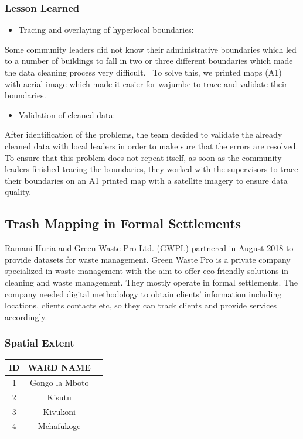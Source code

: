 \documentclass[a4paper,12pt,twoside]{article}
\begin{document}
\subsubsection{Lesson Learned}
\begin{itemize}
    \item Tracing and overlaying of hyperlocal boundaries:
\end{itemize}
Some community leaders did not know their administrative boundaries which led to a number of buildings to fall in two or three different boundaries which made the data cleaning process very difficult.
\
To solve this, we printed maps (A1) with aerial image which made it easier for wajumbe to trace and validate their boundaries. 
\begin{itemize}
    \item Validation of cleaned data:
\end{itemize}
After identification of the problems, the team decided to validate the already cleaned data with local leaders in order to make sure that the errors are resolved. To ensure that this problem does not repeat itself, as soon as the community leaders finished tracing the boundaries, they worked with the supervisors to trace their boundaries on an A1 printed map with a satellite imagery to ensure data quality. 


\newpage

\subsection{Trash Mapping in Formal Settlements}

Ramani Huria and Green Waste Pro Ltd. (GWPL) partnered in August 2018 to provide datasets for waste management. Green Waste Pro is a private company specialized in waste management with the aim to offer eco-friendly solutions in cleaning and waste management. They mostly operate in formal settlements. The company needed digital methodology to obtain clients’ information including locations, clients contacts etc, so they can track clients and provide services accordingly.

\subsubsection{Spatial Extent}

\begin{center}
\begin{tabular}{|c|c|c|}
\hline
ID & WARD NAME\\
\hline
1 & Gongo la Mboto\\
\hline
2 & Kisutu\\
\hline
3 & Kivukoni\\
\hline
4 & Mchafukoge\\
 \hline
\end{tabular}
\end{center}
\end{document}
